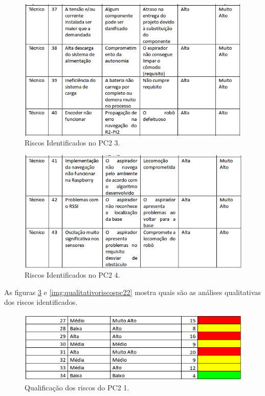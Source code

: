\begin{figure}[H]
	\centering
	\includegraphics[scale=0.5]{figuras/riscos_pc2_3.png}
	\caption{Riscos Identificados no PC2 3.}
	\label{img:riscospc23}
\end{figure}

\begin{figure}[H]
	\centering
	\includegraphics[scale=0.5]{figuras/riscos_pc2_4.png}
	\caption{Riscos Identificados no PC2 4.}
	\label{img:riscospc24}
\end{figure}

As figuras \ref{img:qualitativoriscospc2} e \ref{img:qualitativoriscospc22} mostra quais são as análises qualitativas dos riscos identificados.

\begin{figure}[H]
	\centering
	\includegraphics[scale=0.5]{figuras/riscosQualitativopc2.png}
	\caption{Qualificação dos riscos do PC2 1.}
	\label{img:qualitativoriscospc2}
\end{figure}

